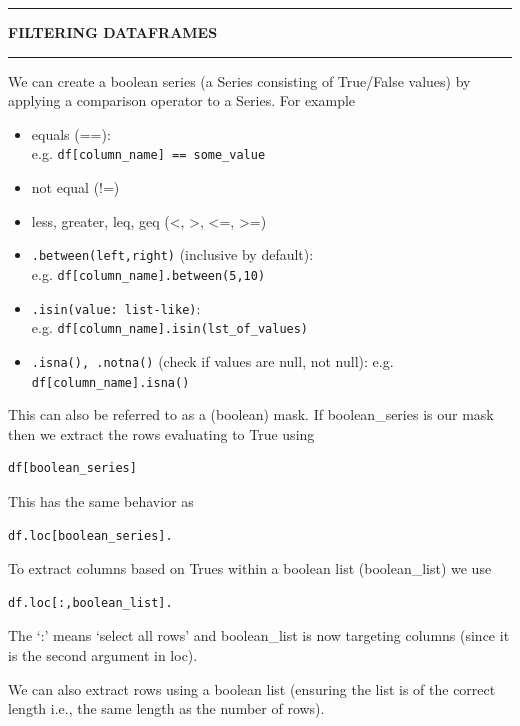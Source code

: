 \documentclass[8pt]{extarticle}
\newcommand{\heading}[1]{%
    \noindent
    \rule{\linewidth}{0.4pt}
    \begin{center}
        \vspace{-1ex}
        \textbf{#1}        
        \vspace{-2.5ex}
    \end{center}
    \rule{\linewidth}{0.4pt}
}
\begin{document}
\begin{multicols}{4}
\heading{FILTERING DATAFRAMES}

We can create a boolean series (a Series consisting of True/False values) by applying a comparison operator to a Series. For example

\begin{itemize}
    \item equals (==): \\
    e.g. \lstinline[style=Python]!df[column_name] == some_value !
    \item not equal (!=)
    \item less, greater, leq, geq (<, >, <=, >=)
    \item \lstinline[style=Python]!.between(left,right)! (inclusive by default): \\
    e.g. \lstinline[style=Python]!df[column_name].between(5,10) !
    \item \lstinline[style=Python]!.isin(value: list-like)!: \\
    e.g. \lstinline[style=Python]!df[column_name].isin(lst_of_values) !
    \item \lstinline[style=Python]!.isna(), .notna()! (check if values are null, not null): e.g. \lstinline[style=Python]!df[column_name].isna() !
\end{itemize}

This can also be referred to as a (boolean) mask. If boolean\_series is our mask then we extract the rows evaluating to True using
\begin{lstlisting}[style=Python]
df[boolean_series]
\end{lstlisting}

\begin{tcolorbox}[width=\columnwidth, colback=white!95!black]
This has the same behavior as 
\begin{lstlisting}[style=Python]
df.loc[boolean_series].
\end{lstlisting}
To extract columns based on Trues within a boolean list (boolean\_list) we use 
\begin{lstlisting}[style=Python]
df.loc[:,boolean_list].
\end{lstlisting}
The `:' means `select all rows' and boolean\_list is now targeting columns (since it is the second argument in loc).
\end{tcolorbox}

We can also extract rows using a boolean list (ensuring the list is of the correct length i.e., the same length as the number of rows).\\


\end{multicols}
\end{document}
